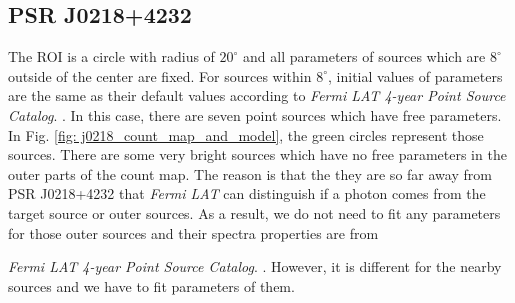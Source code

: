 \documentclass[12pt]{report}
\newcommand{\mycaption}[1]{\protect \caption{#1}}
\newcommand{\fgl}[0]{
  \textit{Fermi LAT 4-year Point Source Catalog}.
}
\begin{document}
          \begin{table}[!ht]
            \centering
            \mycaption{Fit results with data from year 2009 to year 2018. The physical 
              meanings of $\Gamma$ and $E_c$ are the same as Table 
              \ref{table: previous_result_comparison}.}
            \label{table: 2018_fit_data}
          \end{table}
          \vspace{1cm}            

        \subsection{PSR J0218+4232}
          The ROI is a circle with radius of $20^\circ$ and all parameters of sources which 
          are $8^\circ$ outside of the center are fixed. For sources within $8^\circ$, initial
          values of parameters are the same as their default values according to \fgl.
          In this case, there are seven point sources which have free parameters. In Fig.
          \ref{fig: j0218_count_map_and_model}, the green circles represent those sources.
          There are some very bright sources which have no free parameters
          in the outer parts of the count map. The reason is that the they are so far away 
          from PSR J0218+4232 that \textit{Fermi LAT} can distinguish if a photon comes 
          from the target source or outer sources. As a result, we do not need to fit 
          any parameters for those outer sources and their spectra properties are from 
          \fgl. However, it is different for the nearby sources and we have to fit parameters
          of them.
          
\end{document}
